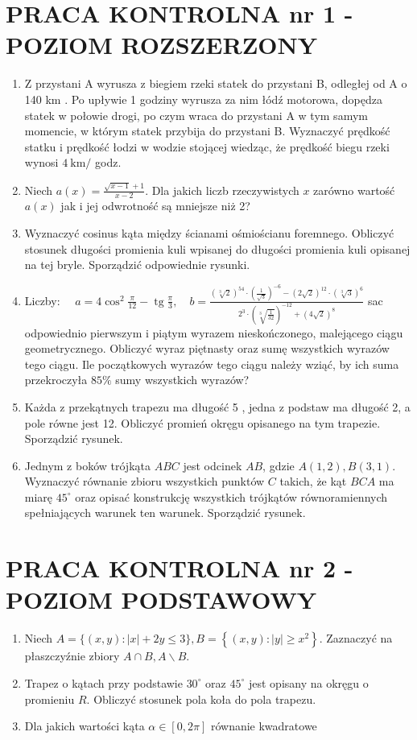 \documentclass[10pt]{article}
\begin{document}
\section*{PRACA KONTROLNA nr 1 - POZIOM ROZSZERZONY}
\begin{enumerate}
  \item Z przystani A wyrusza z biegiem rzeki statek do przystani B, odległej od A o 140 km . Po upływie 1 godziny wyrusza za nim łódź motorowa, dopędza statek w połowie drogi, po czym wraca do przystani A w tym samym momencie, w którym statek przybija do przystani B. Wyznaczyć prędkość statku i prędkość łodzi w wodzie stojącej wiedząc, że prędkość biegu rzeki wynosi $4 \mathrm{~km} /$ godz.
  \item Niech $a(x)=\frac{\sqrt{x-1}+1}{x-2}$. Dla jakich liczb rzeczywistych $x$ zarówno wartość $a(x)$ jak i jej odwrotność są mniejsze niż 2?
  \item Wyznaczyć cosinus kąta między ścianami ośmiościanu foremnego. Obliczyć stosunek długości promienia kuli wpisanej do długości promienia kuli opisanej na tej bryle. Sporządzić odpowiednie rysunki.
  \item Liczby: $\quad a=4 \cos ^{2} \frac{\pi}{12}-\operatorname{tg} \frac{\pi}{3}, \quad b=\frac{(\sqrt[3]{2})^{54} \cdot\left(\frac{1}{\sqrt{3}}\right)^{-6}-(2 \sqrt{2})^{12} \cdot(\sqrt[3]{3})^{6}}{2^{3} \cdot\left(\sqrt[3]{\frac{1}{32}}\right)^{-12}+(4 \sqrt{2})^{8}}$ sac odpowiednio pierwszym i piątym wyrazem nieskończonego, malejącego ciągu geometrycznego. Obliczyć wyraz piętnasty oraz sumę wszystkich wyrazów tego ciągu. Ile początkowych wyrazów tego ciągu należy wziąć, by ich suma przekroczyła $85 \%$ sumy wszystkich wyrazów?
  \item Każda z przekątnych trapezu ma długość 5 , jedna z podstaw ma długość 2, a pole równe jest 12. Obliczyć promień okręgu opisanego na tym trapezie. Sporządzić rysunek.
  \item Jednym z boków trójkąta $A B C$ jest odcinek $A B$, gdzie $A(1,2), B(3,1)$. Wyznaczyć równanie zbioru wszystkich punktów $C$ takich, że kąt $B C A$ ma miarę $45^{\circ}$ oraz opisać konstrukcję wszystkich trójkątów równoramiennych spełniających warunek ten warunek. Sporządzić rysunek.
\end{enumerate}

\section*{PRACA KONTROLNA nr 2 - POZIOM PODSTAWOWY}
\begin{enumerate}
  \item Niech $A=\{(x, y):|x|+2 y \leqslant 3\}, B=\left\{(x, y):|y| \geqslant x^{2}\right\}$. Zaznaczyć na płaszczyźnie zbiory $A \cap B, A \backslash B$.
  \item Trapez o kątach przy podstawie $30^{\circ}$ oraz $45^{\circ}$ jest opisany na okręgu o promieniu $R$. Obliczyć stosunek pola koła do pola trapezu.
  \item Dla jakich wartości kąta $\alpha \in[0,2 \pi]$ równanie kwadratowe
\end{enumerate}
\end{document}
